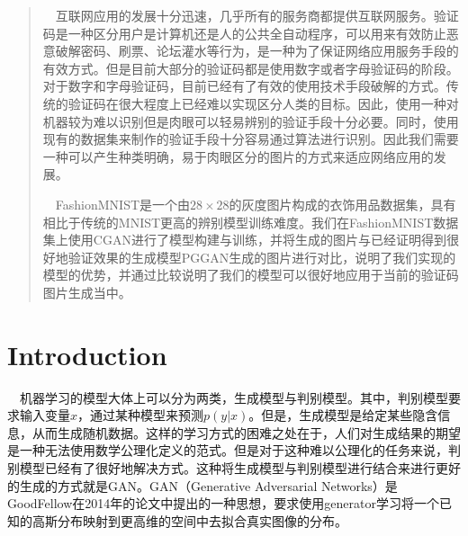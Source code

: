 \documentclass[portrait]{a0poster}
\begin{document}
\begin{multicols}{2} %


\color{Navy} %
\begin{CJK}{UTF8}{gbsn}
\begin{abstract}
\ \ 互联网应用的发展十分迅速，几乎所有的服务商都提供互联网服务。验证码是一种区分用户是计算机还是人的公共全自动程序，可以用来有效防止恶意破解密码、刷票、论坛灌水等行为，是一种为了保证网络应用服务手段的有效方式。但是目前大部分的验证码都是使用数字或者字母验证码的阶段。对于数字和字母验证码，目前已经有了有效的使用技术手段破解的方式\supercite{10.1007}。传统的验证码在很大程度上已经难以实现区分人类的目标。因此，使用一种对机器较为难以识别但是肉眼可以轻易辨别的验证手段十分必要。同时，使用现有的数据集来制作的验证手段十分容易通过算法进行识别。因此我们需要一种可以产生种类明确，易于肉眼区分的图片的方式来适应网络应用的发展。

\ \ FashionMNIST\supercite{DBLP}是一个由$28\times 28$的灰度图片构成的衣饰用品数据集，具有相比于传统的MNIST更高的辨别模型训练难度。我们在FashionMNIST数据集上使用CGAN进行了模型构建与训练，并将生成的图片与已经证明得到很好地验证效果的生成模型PGGAN\supercite{DBLP:journals/corr/abs-1710-10196}生成的图片进行对比，说明了我们实现的模型的优势，并通过比较说明了我们的模型可以很好地应用于当前的验证码图片生成当中。
\end{abstract}
\end{CJK}

\color{SaddleBrown} %

\section*{Introduction}
\begin{CJK}{UTF8}{gbsn}
\ \ 机器学习的模型大体上可以分为两类，生成模型与判别模型。其中，判别模型要求输入变量$x$，通过某种模型来预测$p(y|x)$。但是，生成模型是给定某些隐含信息，从而生成随机数据。这样的学习方式的困难之处在于，人们对生成结果的期望是一种无法使用数学公理化定义的范式。但是对于这种难以公理化的任务来说，判别模型已经有了很好地解决方式。这种将生成模型与判别模型进行结合来进行更好的生成的方式就是GAN\supercite{NIPS2014_5423}。GAN（Generative Adversarial Networks）是GoodFellow在2014年的论文中提出的一种思想，要求使用generator学习将一个已知的高斯分布映射到更高维的空间中去拟合真实图像的分布。


\end{CJK}
\end{multicols}
\end{document}
